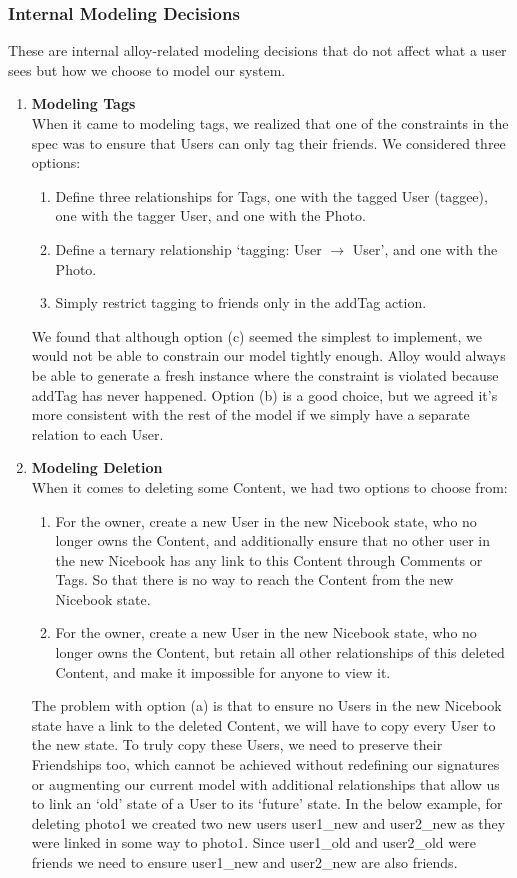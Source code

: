 \documentclass[titlepage]{article}
\begin{document}
\subsubsection{Internal Modeling Decisions}
These are internal alloy-related modeling decisions that do not affect what a user sees but how we choose to model our system.
\begin{enumerate}
	\item \textbf{Modeling Tags}\\
	      When it came to modeling tags, we realized that one of the constraints in the spec was to ensure that Users can only tag their friends. We considered three options:
	      \begin{enumerate}
		      \item Define three relationships for Tags, one with the tagged User (taggee), one with the tagger User, and one with the Photo.
		      \item Define a ternary relationship ‘tagging: User $\rightarrow$ User’, and one with the Photo.
		      \item Simply restrict tagging to friends only in the addTag action.
	      \end{enumerate}
	      We found that although option (c) seemed the simplest to implement, we would not be able to constrain our model tightly enough. Alloy would always be able to generate a fresh instance where the constraint is violated because addTag has never happened. Option (b) is a good choice, but we agreed it’s more consistent with the rest of the model if we simply have a separate relation to each User.
	\item \textbf{Modeling Deletion}\\
	      When it comes to deleting some Content, we had two options to choose from:
	      \begin{enumerate}
		      \item For the owner, create a new User in the new Nicebook state, who no longer owns the Content, and additionally ensure that no other user in the new Nicebook has any link to this Content through Comments or Tags. So that there is no way to reach the Content from the new Nicebook state.
		      \item For the owner, create a new User in the new Nicebook state, who no longer owns the Content, but retain all other relationships of this deleted Content, and make it impossible for anyone to view it.
	      \end{enumerate}
	      The problem with option (a) is that to ensure no Users in the new Nicebook state have a link to the deleted Content, we will have to copy every User to the new state. To truly copy these Users, we need to preserve their Friendships too, which cannot be achieved without redefining our signatures or augmenting our current model with additional relationships that allow us to link an ‘old’ state of a User to its ‘future’ state. In the below example, for deleting photo1 we created two new users user1\_new and user2\_new as they were linked in some way to photo1. Since user1\_old and user2\_old were friends we need to ensure user1\_new and user2\_new are also friends.


\end{enumerate}
\end{document}
